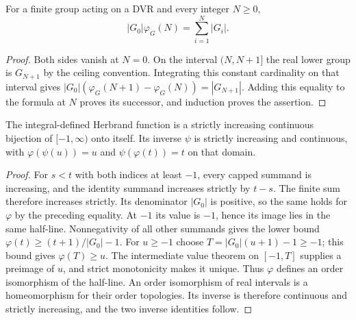 \begin{lemma}
\label{fw:herbrand-integer-sum}
\leanok
For a finite group acting on a DVR and every integer $N\geq0$,
\[
 |G_0|\varphi_G(N)=\sum_{i=1}^{N}|G_i|.
\]
\end{lemma}
\begin{proof}
Both sides vanish at $N=0$. On the interval $(N,N+1]$ the real
lower group is $G_{N+1}$ by the ceiling convention. Integrating this constant cardinality on that interval gives
$|G_0|(\varphi_G(N+1)-\varphi_G(N))=|G_{N+1}|$.
Adding this equality to the formula at $N$ proves its successor,
and induction proves the assertion.
\end{proof}

\begin{lemma}
\label{fw:herbrand-order-isomorphism}
\leanok
The integral-defined Herbrand function is a strictly increasing continuous
bijection of $[-1,\infty)$ onto itself. Its inverse $\psi$ is strictly
increasing and continuous, with $\varphi(\psi(u))=u$ and
$\psi(\varphi(t))=t$ on that domain.
\end{lemma}
\begin{proof}
For $s<t$ with both indices at least $-1$, every capped summand is
increasing, and the identity summand increases strictly by $t-s$.
The finite sum therefore increases strictly. Its denominator $|G_0|$
is positive, so the same holds for $\varphi$ by the preceding equality.
At $-1$ its value is $-1$, hence its image lies in the same half-line.
Nonnegativity of all other summands gives the lower bound
$\varphi(t)\geq (t+1)/|G_0|-1$. For $u\geq-1$ choose
$T=|G_0|(u+1)-1\geq-1$; this bound gives $\varphi(T)\geq u$.
The intermediate value theorem on $[-1,T]$ supplies a preimage of $u$,
and strict monotonicity makes it unique. Thus $\varphi$ defines an order
isomorphism of the half-line. An order isomorphism of real intervals
is a homeomorphism for their order topologies. Its inverse is therefore
continuous and strictly increasing, and the two inverse identities follow.
\end{proof}

